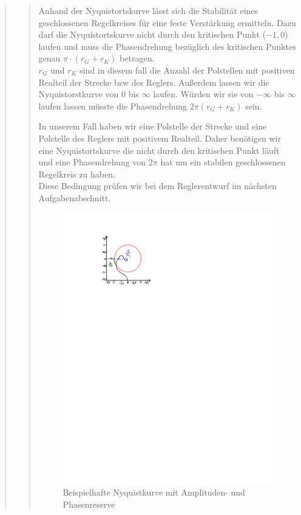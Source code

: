 \begin{quote}
\begin{quote}
        Anhand der Nyquistortskurve lässt sich die Stabilität eines geschlossenen Regelkreises für eine feste
        Verstärkung ermitteln. Dazu darf die Nyquistortskurve nicht durch den kritischen Punkt ($-1,0$) laufen und muss
        die Phasendrehung bezüglich des kritischen Punktes genau $\pi \cdot (r_G + r_K)$ betragen.\\
        $r_G$ und $r_K$ sind in diesem fall die Anzahl der Polstellen mit positiven Realteil der Strecke bzw des
        Reglers.
        Außerdem lassen wir die Nyquistorstkurve von $0$ bis $\infty$ laufen. Würden wir sie von $-\infty$ bis $\infty$
        laufen lassen müsste die Phasendrehung $2\pi (r_G + r_K)$ sein.\vspace{1em}
        
        In unserem Fall haben wir eine Polstelle der Strecke und eine Polstelle des Reglers mit positivem Realteil. Daher
        benötigen wir eine Nyquistortskurve die nicht durch den kritischen Punkt läuft und eine Phasendrehung von $2\pi$ hat um ein stabilen geschlossenen Regelkreis zu haben.\\
        Diese Bedingung prüfen wir bei dem Reglerentwurf im nächsten Aufgabenabschnitt.\vspace{1em}
        
        \begin{figure}[H]
        \centering
            \includegraphics[scale=1.3, trim = 4cm 20.5cm 12.5cm 2cm, clip]{Bilder/Nyquist_beispiel}
                \caption{Beispielhafte Nyquistkurve mit Amplituden- und Phasenreserve}
                \label{fig:Nyquist_beispiel}
        \end{figure}
        

\end{quote}
\end{quote}
